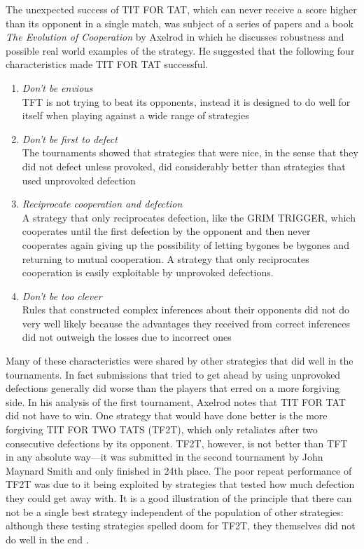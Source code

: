 The unexpected success of TIT FOR TAT, which can never receive a score higher than its opponent in a single match, was subject of a series of papers and a book \textit{The Evolution of Cooperation} by Axelrod in which he discusses robustness and possible real world examples of the strategy. He suggested that the following four characteristics made TIT FOR TAT successful.
\begin{enumerate}
\item \textit{Don't be envious} \\
TFT is not trying to beat its opponents, instead it is designed to do well for itself when playing against a wide range of strategies
\item \textit{Don't be first to defect} \\
The tournaments showed that strategies that were nice, in the sense that they did not defect unless provoked, did considerably better than strategies that used unprovoked defection
\item \textit{Reciprocate cooperation and defection} \\
A strategy that only reciprocates defection, like the GRIM TRIGGER, which cooperates until the first defection by the opponent and then never cooperates again giving up the possibility of letting bygones be bygones and returning to mutual cooperation. A strategy that only reciprocates cooperation is easily exploitable by unprovoked defections.
\item \textit{Don't be too clever} \\
Rules that constructed complex inferences about their opponents did not do very well likely because the advantages they received from correct inferences did not outweigh the losses due to incorrect ones
\end{enumerate}

Many of these characteristics were shared by other strategies that did well in the tournaments. In fact submissions that tried to get ahead by using unprovoked defections generally did worse than the players that erred on a more forgiving side. In his analysis of the first tournament, Axelrod notes that TIT FOR TAT did not have to win. One strategy that would have done better is the more forgiving TIT FOR TWO TATS (TF2T), which only retaliates after two consecutive defections by its opponent. TF2T, however, is not better than TFT in any absolute way---it was submitted in the second tournament by John Maynard Smith and only finished in 24th place. The poor repeat performance of TF2T was due to it being exploited by strategies that tested how much defection they could get away with. It is a good illustration of the principle that there can not be a single best strategy independent of the population of other strategies: although these testing strategies spelled doom for TF2T, they themselves did not do well in the end \cite[p.47]{axelrod1984evolution}.

